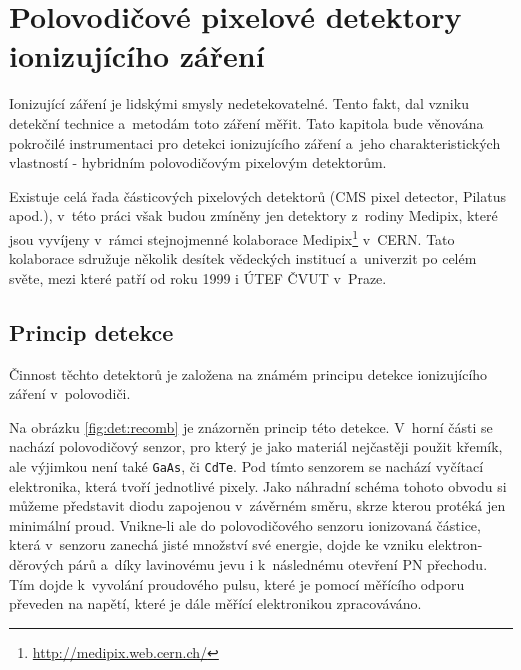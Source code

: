 

\chapter{Polovodičové pixelové detektory ionizujícího záření}\label{det}
Ionizující záření je lidskými smysly nedetekovatelné. Tento fakt, dal vzniku detekční technice a~metodám toto záření měřit. Tato kapitola bude věnována pokročilé instrumentaci pro detekci ionizujícího záření a~jeho charakteristických vlastností - hybridním polovodičovým pixelovým detektorům.

Existuje celá řada částicových pixelových detektorů (CMS pixel detector, Pilatus apod.), v~této práci však budou zmíněny jen detektory z~rodiny Medipix, které jsou vyvíjeny v~rámci stejnojmenné kolaborace Medipix\footnote{\url{http://medipix.web.cern.ch/}} v~CERN. Tato kolaborace sdružuje několik desítek vědeckých institucí a~univerzit po celém světe, mezi které patří od roku 1999 i ÚTEF ČVUT v~Praze.


\clearpage

\section{Princip detekce}
Činnost těchto detektorů je založena na známém principu detekce ionizujícího záření v~polovodiči. 

Na obrázku \ref{fig:det:recomb} je znázorněn princip této detekce. V~horní části se nachází polovodičový senzor, pro který je jako materiál nejčastěji použit křemík, ale výjimkou není také \texttt{GaAs}, či \texttt{CdTe}. Pod tímto senzorem se nachází vyčítací elektronika, která tvoří jednotlivé pixely. Jako náhradní schéma tohoto obvodu si můžeme představit diodu zapojenou v~závěrném směru, skrze kterou protéká jen minimální proud. Vnikne-li ale do polovodičového senzoru ionizovaná částice, která v~senzoru zanechá jisté množství své energie, dojde ke vzniku elektron-děrových párů a~díky lavinovému jevu i k~následnému otevření PN přechodu. Tím dojde k~vyvolání proudového pulsu, které je pomocí měřícího odporu převeden na napětí, které je dále měřící elektronikou zpracováváno.

